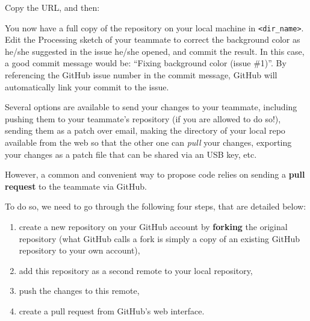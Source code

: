 \documentclass{instructions}
\begin{document}

Copy the URL, and then:


You now have a full copy of the repository on your local machine in
\texttt{<dir\_name>}. Edit the Processing sketch of your teammate to correct the
background color as he/she suggested in the issue he/she opened, and commit the result.
In this case, a good commit message would be: ``Fixing background color (issue
\#1)''. By referencing the GitHub issue number in the commit message, GitHub will
automatically link your commit to the issue.

Several options are available to send your changes to your teammate, including
pushing them to your teammate's repository (if you are allowed to do so!),
sending them as a patch over email, making the directory of your local repo
available from the web so that the other one can \emph{pull} your changes,
exporting your changes as a patch file that can be shared via an USB key, etc.

However, a common and convenient way to propose code relies on sending a
\textbf{pull request} to the teammate via GitHub.

To do so, we need to go through the following four steps, that are detailed
below:

\begin{enumerate}
    \item create a new repository on your GitHub account by \textbf{forking} the
        original repository (what GitHub calls a fork is simply a copy of an
        existing GitHub repository to your own account),
    \item add this repository as a second remote to your local repository,
    \item push the changes to this remote,
    \item create a pull request from GitHub's web interface.
\end{enumerate}

\end{document}
